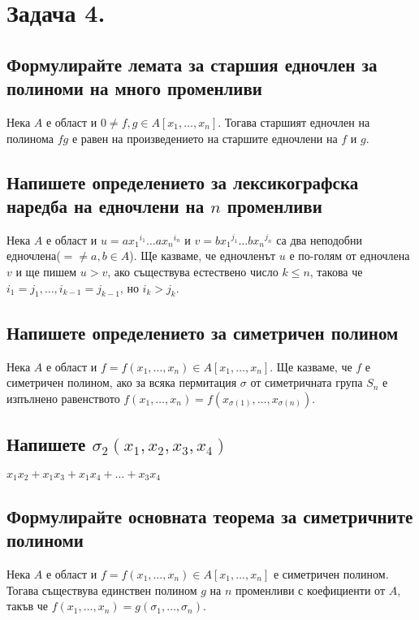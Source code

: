 \documentclass[10pt]{article}
\begin{document}
\section*{Задача 4.}

\subsection*{Формулирайте лемата за старшия едночлен за полиноми на много променливи}
Нека $A$ е област и $0 \neq f,g \in A[x_1,\ldots,x_n]$. Тогава старшият едночлен на полинома $fg$ е равен на произведението на старшите едночлени на $f$ и $g$.

\subsection*{Напишете определението за лексикографска наредба на едночлени на $n$ променливи}
Нека $A$ е област и $u = ax_1{}^{i_1} \ldots ax_n{}^{i_n}$ и $v = bx_1{}^{j_1} \ldots bx_n{}^{j_n}$ са два неподобни едночлена($= \neq a,b \in A$). Ще казваме, че едночленът $u$ е по-голям от едночлена $v$ и ще пишем $u > v$, ако съществува естествено число $k \leq n$, такова че $i_1 = j_1, \ldots , i_{k-1} = j_{k-1}$, но $i_k > j_k$.

\subsection*{Напишете определението за симетричен полином}
Нека $A$ е област и $f = f(x_1, \ldots ,x_n) \in A[x_1, \ldots ,x_n]$. Ще казваме, че $f$ е симетричен полином, ако за всяка пермитация $\sigma$ от симетричната група $S_n$ е изпълнено равенството $f(x_1, \ldots ,x_n) = f(x_{\sigma(1)}, \ldots ,x_{\sigma(n)})$.

\subsection*{Напишете $\sigma_2(x_1, x_2, x_3, x_4)$}
$x_1x_2 + x_1x_3 + x_1x_4 + \ldots + x_3x_4$

\subsection*{Формулирайте основната теорема за симетричните полиноми}
Нека $A$ е област и $f = f(x_1, \ldots ,x_n) \in A[x_1, \ldots ,x_n]$ е симетричен полином. Тогава съществува единствен полином $g$ на $n$ променливи с коефициенти от $A$, такъв че $f(x_1, \ldots ,x_n) = g(\sigma_1, \ldots, \sigma_n)$.
 
\end{document}
